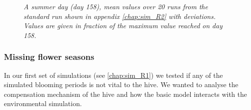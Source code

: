 		\begin{figure}[H]
			\centering
			\caption{\textit{A summer day (day 158), mean values over 20 runs from the standard run shown in appendix \ref{chap:sim_R2} with deviations. Values are given in fraction of the maximum value reached on day 158.}}
			\label{fig:day158variation}
		\end{figure}
	
	\subsubsection{Missing flower seasons}
		\label{chap:missingFlowerSeasons}
		In our first set of simulations (see \ref{chap:sim_R1}) we tested if any of the simulated blooming periods is not vital to the hive. We wanted to analyse the compensation mechanism of the hive and how the basic model interacts with the environmental simulation.\\
		
